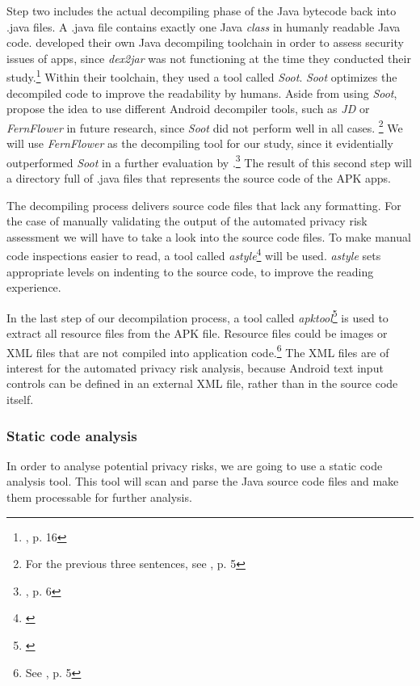 \documentclass[
	a4paper,
	oneside,
	12pt,
	liststotocnumbered
]{article}
\let\cite\textcite
\begin{document}
Step two includes the actual decompiling phase of the Java bytecode back into .java files. 
A .java file contains exactly one Java \textit{class} in humanly readable Java code. 
\cite{Enck2011} developed their own Java decompiling toolchain in order to assess security issues of \mH apps, since \textit{dex2jar} was not functioning at the time they conducted their study.\footnote{\cite{Enck2011}, p. 16}
Within their toolchain, they used a tool called \textit{Soot}.
\textit{Soot} optimizes the decompiled code to improve the readability by humans.
Aside from using \textit{Soot}, \cite{Enck2011} propose the idea to use different Android decompiler tools, such as \textit{JD} or \textit{FernFlower} in future research, since \textit{Soot} did not perform well in all cases. \footnote{For the previous three sentences, see \cite{Enck2011}, p. 5}
We will use \textit{FernFlower} as the decompiling tool for our study, since it evidentially outperformed \textit{Soot} in a further evaluation by \cite{Enck2011}.\footnote{\cite{Enck2011}, p. 6}
The result of this second step will a directory full of .java files that represents the source code of the \acs{APK} apps.

The decompiling process delivers source code files that lack any formatting.
For the case of manually validating the output of the automated privacy risk assessment we will have to take a look into the source code files. 
To make manual code inspections easier to read, a tool called \textit{astyle}\footnote{\cite{Davidson2006}} will be used. 
\textit{astyle} sets appropriate levels on indenting to the source code, to improve the reading experience.

In the last step of our decompilation process, a tool called \textit{apktool}\footnote{\cite{Tumbleson2010}} is used to extract all resource files from the \acs{APK} file. Resource files could be images or XML files that are not compiled into application code.\footnote{See \cite{xu2013techniques}, p. 5}
The XML files are of interest for the automated privacy risk analysis, because Android text input controls can be defined in an external XML file, rather than in the source code itself.

\subsubsection{Static code analysis}
In order to analyse potential privacy risks, we are going to use a static code analysis tool.
This tool will scan and parse the Java source code files and make them processable for further analysis.
\end{document}
